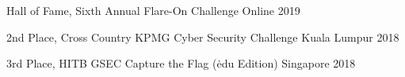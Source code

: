 



\begin{cvhonors}

  \cvhonor
    {Hall of Fame,} 
    {Sixth Annual Flare-On Challenge} 
    {Online} 
    {2019}

  \cvhonor
    {2nd Place,} 
    {Cross Country KPMG Cyber Security Challenge} 
    {Kuala Lumpur} 
    {2018}

  \cvhonor
    {3rd Place,} 
    {HITB GSEC Capture the Flag (\.edu Edition)} 
    {Singapore} 
    {2018} 

\end{cvhonors}





